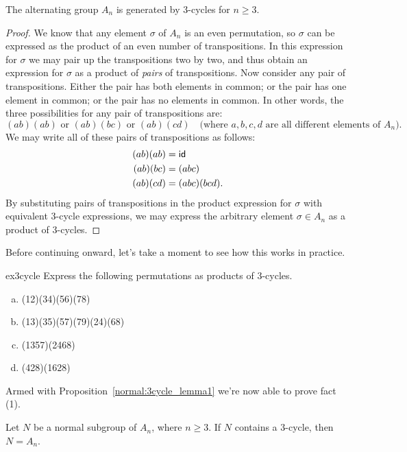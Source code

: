 {\begin{thm}\label{normal:3cycle_lemma1}
The alternating group $A_n$ is generated by $3$-cycles for $n \geq 3$.
\end{thm}
 
\begin{proof}
We know that any element $\sigma$ of $A_n$ is an even permutation, so $\sigma$ can be expressed as the product of an even number of transpositions. In this  expression for $\sigma$ we may pair up the transpositions two by two, and thus obtain an expression for $\sigma$ as a product of \emph{pairs} of transpositions. Now consider any pair of transpositions. Either the pair has both elements in common; or the pair has one element in common; or the pair has no elements in common. In other words, the three possibilities for any pair of transpositions are:
\[ (ab)(ab) \text{ or } (ab)(bc)  \text{ or } (ab)(cd) \quad \text{(where } a,b,c,d \text{ are all different elements of } A_n).\]
We may write all of these pairs of transpositions as follows:
\begin{align*}
(ab)(ab) & = {\sf{i}d} \\
(ab)(bc) & = (abc) \\
(ab)(cd) & = (abc)(bcd).
\end{align*}
By substituting pairs of transpositions in the product expression for $\sigma$ with equivalent 3-cycle expressions, we may express the arbitrary element $\sigma \in A_n$ as a product of 3-cycles.
\end{proof}

Before continuing onward, let's take a moment to see how this works in practice.
 \begin{exercise}{ex3cycle}
 Express the following permutations as products of 3-cycles.
\begin{enumerate}[(a)]
\item 
(12)(34)(56)(78)
\item 
(13)(35)(57)(79)(24)(68)
\item 
(1357)(2468)
\item 
(428)(1628)
\end{enumerate}
 \end{exercise}
Armed with Proposition~\ref{normal:3cycle_lemma1} we're now able to prove fact (1).

\begin{thm}\label{normal:3cycle_lemma2}
Let $N$ be a  normal subgroup of $A_n$, where $n \geq 3$. If $N$ 
contains a $3$-cycle, then $N = A_n$. 
\end{thm}
 
}
